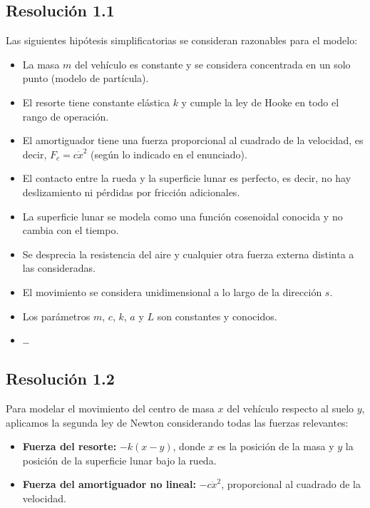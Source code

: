 \documentclass[
  11pt,
  letterpaper,
   addpoints,
   answers
  ]{exam}
\begin{document}
\begin{questions}
\begin{enumerate}
\end{enumerate}

\begin{solution}
\subsection*{Resolución 1.1}
Las siguientes hipótesis simplificatorias se consideran razonables para el modelo:
\begin{itemize}
  \item La masa $m$ del vehículo es constante y se considera concentrada en un solo punto (modelo de partícula).
  \item El resorte tiene constante elástica $k$ y cumple la ley de Hooke en todo el rango de operación.
  \item El amortiguador tiene una fuerza proporcional al cuadrado de la velocidad, es decir, $F_c = c \dot{x}^2$ (según lo indicado en el enunciado).
  \item El contacto entre la rueda y la superficie lunar es perfecto, es decir, no hay deslizamiento ni pérdidas por fricción adicionales.
  \item La superficie lunar se modela como una función cosenoidal conocida y no cambia con el tiempo.
  \item Se desprecia la resistencia del aire y cualquier otra fuerza externa distinta a las consideradas.
  \item El movimiento se considera unidimensional a lo largo de la dirección $s$.
  \item Los parámetros $m$, $c$, $k$, $a$ y $L$ son constantes y conocidos.
  \item \dots
\end{itemize}

\subsection*{Resolución 1.2}

Para modelar el movimiento del centro de masa $x$ del vehículo respecto al suelo $y$, aplicamos la segunda ley de Newton considerando todas las fuerzas relevantes:
\begin{itemize}
  \item \textbf{Fuerza del resorte:} $-k(x - y)$, donde $x$ es la posición de la masa y $y$ la posición de la superficie lunar bajo la rueda.
  \item \textbf{Fuerza del amortiguador no lineal:} $-c\dot{x}^2$, proporcional al cuadrado de la velocidad.
\end{itemize}


\end{solution}
\end{questions}
\end{document}
